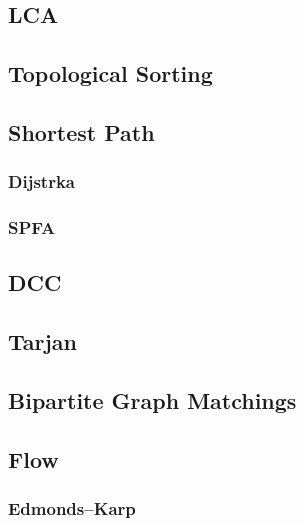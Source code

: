 \documentclass[a4paper]{article}
\begin{document}
\subsection{LCA}


\subsection{Topological Sorting}


\subsection{Shortest Path}

\subsubsection{Dijstrka}


\subsubsection{SPFA}


\subsection{DCC}



\subsection{Tarjan}



\subsection{Bipartite Graph Matchings}



\subsection{Flow}

\subsubsection{Edmonds–Karp}
\end{document}
